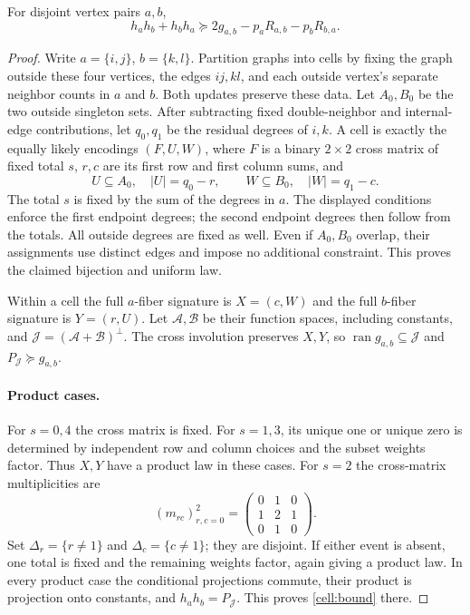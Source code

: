 \begin{lemma}\label{cell:interaction}
For disjoint vertex pairs $a,b$,
\begin{equation}\label{cell:bound}
 h_ah_b+h_bh_a\succeq2g_{a,b}-p_aR_{a,b}-p_bR_{b,a}.
\end{equation}
\end{lemma}
\begin{proof}
Write $a=\{i,j\}$, $b=\{k,l\}$. Partition graphs into cells by fixing the
graph outside these four vertices, the edges $ij,kl$, and each outside
vertex's separate neighbor counts in $a$ and $b$. Both updates preserve these
data. Let $A_0,B_0$ be the two outside singleton sets. After subtracting fixed
double-neighbor and internal-edge contributions, let $q_0,q_1$ be the residual
degrees of $i,k$. A cell is exactly the equally likely encodings
$(F,U,W)$, where $F$ is a binary $2\times2$ cross matrix of fixed total $s$,
$r,c$ are its first row and first column sums, and
\[
 U\subseteq A_0,\quad |U|=q_0-r,\qquad
 W\subseteq B_0,\quad |W|=q_1-c.
\]
The total $s$ is fixed by the sum of the degrees in $a$. The displayed
conditions enforce the first endpoint degrees; the second endpoint degrees
then follow from the totals. All outside degrees are fixed as well.
Even if $A_0,B_0$ overlap, their assignments use distinct edges and impose no
additional constraint. This proves the claimed bijection and uniform law.

Within a cell the full $a$-fiber signature is $X=(c,W)$ and the full
$b$-fiber signature is $Y=(r,U)$. Let $\mathcal A,\mathcal B$ be their
function spaces, including constants, and
$\mathcal J=(\mathcal A+\mathcal B)^\perp$. The cross involution preserves
$X,Y$, so $\operatorname{ran}g_{a,b}\subseteq\mathcal J$ and
$P_{\mathcal J}\succeq g_{a,b}$.

\paragraph{Product cases.}
For $s=0,4$ the cross matrix is fixed. For $s=1,3$, its unique one or unique
zero is determined by independent row and column choices and the subset
weights factor. Thus $X,Y$ have a product law in these cases. For $s=2$ the
cross-matrix multiplicities are
\begin{equation}\label{cell:crossmatrix}
 (m_{rc})_{r,c=0}^2=\begin{pmatrix}0&1&0\\1&2&1\\0&1&0\end{pmatrix}.
\end{equation}
Set $\Delta_r=\{r\ne1\}$ and $\Delta_c=\{c\ne1\}$; they are disjoint. If either event
is absent, one total is fixed and the remaining weights factor, again giving
a product law. In every product case the conditional projections commute,
their product is projection onto constants, and $h_ah_b=P_{\mathcal J}$. This
proves \eqref{cell:bound} there.


\end{proof}
